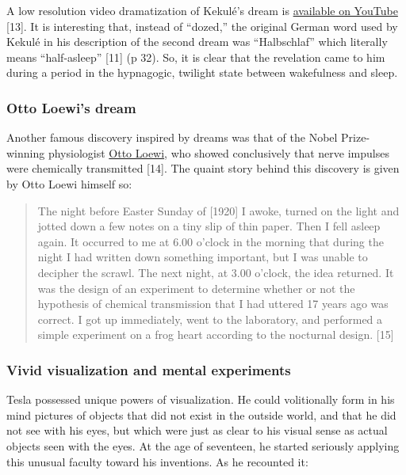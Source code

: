 \documentclass[
  11pt,
  a4paper,
]{article}
\begin{document}
A low resolution video dramatization of Kekulé's dream is
\href{https://www.youtube.com/watch?v=2NRwd-JJFm4}{available on YouTube}
{[}13{]}. It is interesting that, instead of ``dozed,'' the original
German word used by Kekulé in his description of the second dream was
``Halbschlaf'' which literally means ``half-asleep'' {[}11{]} (p 32).
So, it is clear that the revelation came to him during a period in the
hypnagogic, twilight state between wakefulness and sleep.

\hypertarget{otto-loewis-dream}{%
\subsubsection{Otto Loewi's dream}\label{otto-loewis-dream}}

Another famous discovery inspired by dreams was that of the Nobel
Prize-winning physiologist
\href{https://en.wikipedia.org/wiki/Otto_Loewi}{Otto Loewi}, who showed
conclusively that nerve impulses were chemically transmitted {[}14{]}.
The quaint story behind this discovery is given by Otto Loewi himself
so:

\begin{quote}
The night before Easter Sunday of {[}1920{]} I awoke, turned on the
light and jotted down a few notes on a tiny slip of thin paper. Then I
fell asleep again. It occurred to me at 6.00 o'clock in the morning that
during the night I had written down something important, but I was
unable to decipher the scrawl. The next night, at 3.00 o'clock, the idea
returned. It was the design of an experiment to determine whether or not
the hypothesis of chemical transmission that I had uttered 17 years ago
was correct. I got up immediately, went to the laboratory, and performed
a simple experiment on a frog heart according to the nocturnal design.
{[}15{]}
\end{quote}

\hypertarget{vivid-visualization-and-mental-experiments}{%
\subsubsection{Vivid visualization and mental
experiments}\label{vivid-visualization-and-mental-experiments}}

Tesla possessed unique powers of visualization. He could volitionally
form in his mind pictures of objects that did not exist in the outside
world, and that he did not see with his eyes, but which were just as
clear to his visual sense as actual objects seen with the eyes. At the
age of seventeen, he started seriously applying this unusual faculty
toward his inventions. As he recounted it:
\end{document}

